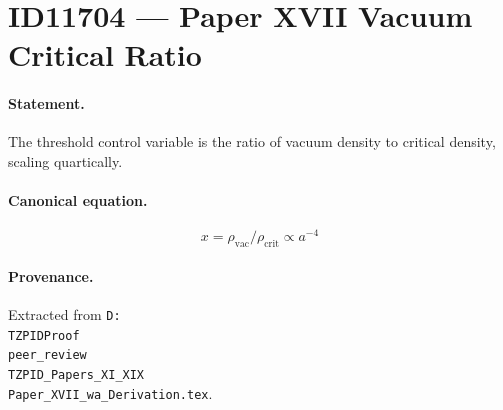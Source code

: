 \section*{ID11704 --- Paper XVII Vacuum Critical Ratio}

\paragraph{Statement.}
The threshold control variable is the ratio of vacuum density to critical density, scaling quartically.

\paragraph{Canonical equation.}
\[
x=\rho_{\mathrm{vac}}/\rho_{\mathrm{crit}}\propto a^{-4}
\]

\paragraph{Provenance.}
Extracted from \texttt{D:\\TZPIDProof\\peer\_review\\TZPID\_Papers\_XI\_XIX\\Paper\_XVII\_wa\_Derivation.tex}.
